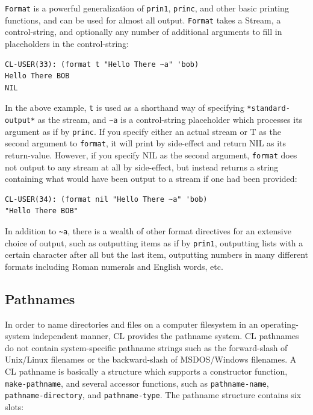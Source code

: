 \texttt{Format} is a powerful generalization of \texttt{prin1}, \texttt{princ}, and other basic printing functions, and
can be used for almost all output. \texttt{Format} takes a Stream, a control-string, and optionally
any number of additional arguments to fill in placeholders in the control-string:

\begin{verbatim}
CL-USER(33): (format t "Hello There ~a" 'bob)
Hello There BOB
NIL
\end{verbatim}

In the above example, \texttt{t} is used as a shorthand way of specifying \texttt{*standard-output*} as the
stream, and \texttt{\~{}a} is a control-string placeholder which processes its argument as if by \texttt{princ}.
If you specify either an actual stream or T as the second argument to \texttt{format}, it will print
by side-effect and return NIL as its return-value. However, if you specify NIL as the second
argument, \texttt{format} does not output to any stream at all by side-effect, but instead returns
a string containing what would have been output to a stream if one had been provided:

\begin{verbatim}
CL-USER(34): (format nil "Hello There ~a" 'bob)
"Hello There BOB"
\end{verbatim}

In addition to \texttt{\~{}a}, there is a wealth of other format directives for an extensive choice of
output, such as outputting items as if by \texttt{prin1}, outputting lists with a certain character
after all but the last item, outputting numbers in many different formats including Roman
numerals and English words, etc.

\subsection{Pathnames}

In order to name directories and files on a computer filesystem in an operating-system
independent manner, CL provides the pathname system. CL pathnames do not contain
system-specific pathname strings such as the forward-slash of Unix/Linux filenames or the
backward-slash of MSDOS/Windows filenames. A CL pathname is basically a structure
which supports a constructor function, \texttt{make-pathname}, and several accessor functions, such
as \texttt{pathname-name}, \texttt{pathname-directory}, and \texttt{pathname-type}. The pathname structure
contains six slots:


